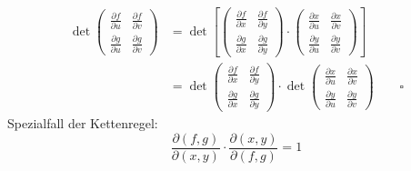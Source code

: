 \begin{equation}
    \begin{split}
        \det
        \begin{pmatrix}
\frac{\partial f}{\partial u} & \frac{\partial f}{\partial v} \\
\frac{\partial g}{\partial u} & \frac{\partial g}{\partial v}
\end{pmatrix}
&= \det \left[
\begin{pmatrix}
\frac{\partial f}{\partial x} & \frac{\partial f}{\partial y} \\
\frac{\partial g}{\partial x} & \frac{\partial g}{\partial y}
\end{pmatrix}
\cdot
\begin{pmatrix}
\frac{\partial x}{\partial u} & \frac{\partial x}{\partial v} \\
\frac{\partial y}{\partial u} & \frac{\partial y}{\partial v}
\end{pmatrix}
\right] \\
&= \det
\begin{pmatrix}
\frac{\partial f}{\partial x} & \frac{\partial f}{\partial y} \\
\frac{\partial g}{\partial x} & \frac{\partial g}{\partial y}
\end{pmatrix}
\cdot \det
\begin{pmatrix}
\frac{\partial x}{\partial u} & \frac{\partial x}{\partial v} \\
\frac{\partial y}{\partial u} & \frac{\partial y}{\partial v}
\end{pmatrix} \qquad \square
    \end{split}
\end{equation}
Spezialfall der Kettenregel:
\begin{equation}
    \frac{\partial(f, g)}{\partial(x, y)} \cdot \frac{\partial(x, y)}{\partial(f, g)} = 1
\end{equation}
